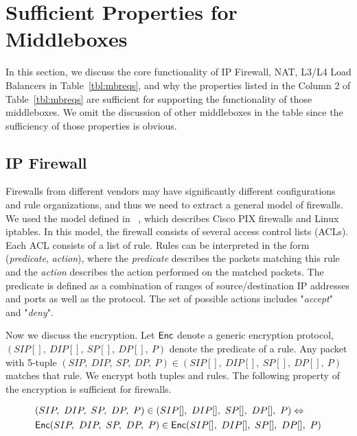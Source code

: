 \newpage
\appendix
\section{Sufficient Properties for Middleboxes} 
\label{sec:appendix:middleboxes}
In this section, we discuss the core functionality of IP Firewall, NAT, L3/L4 Load Balancers 
in Table~\ref{tbl:mbreqs}, and why the properties listed in the Column 2 of Table~\ref{tbl:mbreqs} are
sufficient for supporting the functionality of those middleboxes. We omit the discussion of other middleboxes
 in the table since the sufficiency of those properties is obvious.

\subsection{IP Firewall}
Firewalls from different vendors may have significantly different configurations and rule organizations, 
and thus we need to extract a general model of firewalls. We used the model defined in ~\cite{fireman}, 
which describes Cisco
PIX firewalls and Linux iptables. In this model, the firewall consists of several access control lists (ACLs). 
Each ACL consists of a list of rule. Rules can be interpreted in the form (\emph{predicate}, \emph{action}), 
where the \emph{predicate} describes the packets matching this rule and the \emph{action} describes
the action performed on the matched packets. The predicate is defined as a combination of ranges of source/destination
IP addresses and ports as well as the protocol. The set of possible actions includes "\emph{accept}" and "\emph{deny}".

Now we discuss the encryption. Let $\mathsf{Enc}$ denote a generic encryption protocol,
$(SIP[],\ DIP[],\ SP[],\ DP[],\ P)$ denote the predicate of a rule. Any packet with 5-tuple 
$(SIP,\ DIP,\ SP,\ DP,\ P) \in (SIP[],\ DIP[],\ SP[],\ DP[],\ P)$ matches that rule. 
We encrypt both tuples and rules. The following property of the encryption is sufficient for firewalls.

\begin{equation}
\label{eqn:firewall}
\begin{split}
& (SIP,\ DIP,\ SP,\ DP,\ P) \in (SIP[],\ DIP[],\ SP[],\ DP[],\ P) \Leftrightarrow \\
& \Enc(SIP,\ DIP,\ SP,\ DP,\ P) \in \Enc(SIP[],\ DIP[],\ SP[],\ DP[],\ P) 
\end{split}
\end{equation}

